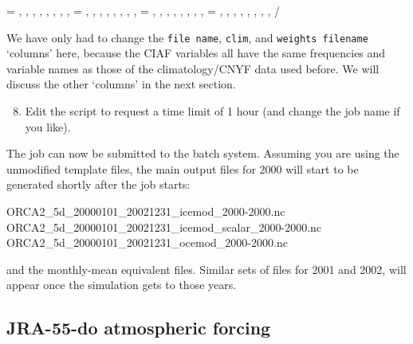\begin{VerbatimNML}[samepage=true]
    =         ,                 , ,   \nmlfalse{}   , \nmlfalse{} ,   ,  , \nmlstring{}       , \nmlstring{}
    = ,                , ,   \nmlfalse{}   , \nmlfalse{} ,   ,  , \nmlstring{}       , \nmlstring{}
    =  ,                ,     ,   \nmlfalse{}   , \nmlfalse{} ,   ,  , \nmlstring{}       , \nmlstring{}
     =          ,                 ,      ,   \nmlfalse{}   , \nmlfalse{} ,   ,  , \nmlstring{}       , \nmlstring{}
/
\end{VerbatimNML}
\endgroup

We have only had to change the \texttt{file name}, \texttt{clim}, and \texttt{weights filename} `columns' here, because the CIAF variables all have the same frequencies and variable names as those of the climatology/CNYF data used before.
We will discuss the other `columns' in the next section.

\begin{enumerate}\setcounter{enumi}{7}
    \item Edit the  script to request a time limit of 1 hour (and change the job name if you like).
\end{enumerate}

The job can now be submitted to the batch system.
Assuming you are using the unmodified template  files, the main output files for 2000 will start to be generated shortly after the job starts:

\begin{VerbatimFile}
ORCA2_5d_20000101_20021231_icemod_2000-2000.nc
ORCA2_5d_20000101_20021231_icemod_scalar_2000-2000.nc
ORCA2_5d_20000101_20021231_ocemod_2000-2000.nc
\end{VerbatimFile}

and the monthly-mean equivalent files.
Similar sets of files for 2001 and 2002, will appear once the simulation gets to those years.


\subsection{JRA-55-do atmospheric forcing}
\label{sec:inputs-jra-55-do}

